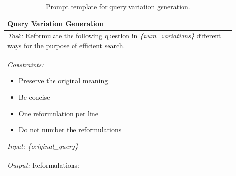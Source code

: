 \documentclass[11pt]{article}
\begin{document}
\begin{table}[t]
    \centering
    \footnotesize
    \caption{Prompt template for query variation generation.}
    \label{tab:prompt_query_variation}
    {\ttfamily %
    \begin{tabular}{p{0.93\linewidth}}
        \hline
        \textbf{Query Variation Generation} \\
        \hline
        \textit{Task:} Reformulate the following question in \textit{\{num\_variations\}} different ways for the purpose of efficient search.\\
        \textit{Constraints:}
        \begin{itemize}[leftmargin=*,noitemsep,topsep=2pt]
            \item Preserve the original meaning
            \item Be concise
            \item One reformulation per line
            \item Do not number the reformulations
        \end{itemize}
        \textit{Input:} \textit{\{original\_query\}}\\
        \textit{Output:} Reformulations:\\
        \hline
    \end{tabular}
    } %
\end{table}
\end{document}
